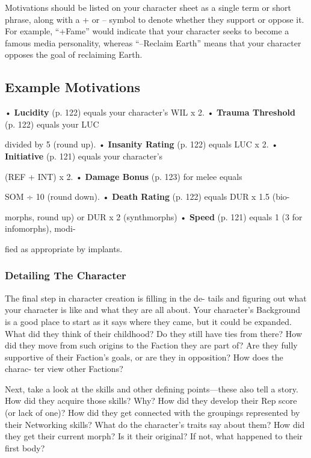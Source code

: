 Motivations should be listed on your character 
sheet as a single term or short phrase, along with a + 
or – symbol to denote whether they support or oppose 
it. For example, ``+Fame'' would indicate that your 
character seeks to become a famous media personality, 
whereas ``–Reclaim Earth'' means that your character 
opposes the goal of reclaiming Earth.

\subsection{Example Motivations}

•  \textbf{Lucidity} (p. 122) equals your character's WIL x 2.
•  \textbf{Trauma Threshold} (p. 122) equals your LUC 

divided by 5 (round up).
•  \textbf{Insanity Rating} (p. 122) equals LUC x 2.
•  \textbf{Initiative} (p. 121) equals your character's 

(REF + INT) x 2.
•  \textbf{Damage Bonus} (p. 123) for melee equals 

SOM ÷ 10 (round down).
•  \textbf{Death Rating} (p. 122) equals DUR x 1.5 (bio-

morphs, round up) or DUR x 2 (synthmorphs)
•  \textbf{Speed} (p. 121) equals 1 (3 for infomorphs), modi-

fied as appropriate by implants.

\subsubsection{Detailing The Character}

The final step in character creation is filling in the de-
tails and figuring out what your character is like and 
what they are all about. Your character's Background 
is a good place to start as it says where they came, but 
it could be expanded. What did they think of their 
childhood? Do they still have ties from there? How 
did they move from such origins to the Faction they 
are part of? Are they fully supportive of their Faction's 
goals, or are they in opposition? How does the charac-
ter view other Factions?

Next, take a look at the skills and other defining 
points—these also tell a story. How did they acquire 
those skills? Why? How did they develop their Rep 
score (or lack of one)? How did they get connected 
with the groupings represented by their Networking 
skills? What do the character's traits say about them? 
How did they get their current morph? Is it their 
original? If not, what happened to their first body?

